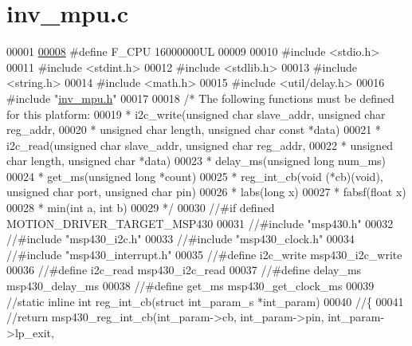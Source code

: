 \hypertarget{inv__mpu_8c_source}{}\section{inv\+\_\+mpu.\+c}
\label{inv__mpu_8c_source}

\begin{DoxyCode}
00001 
\hypertarget{inv__mpu_8c_source.tex_l00008}{}\hyperlink{inv__mpu_8c_a43bafb28b29491ec7f871319b5a3b2f8}{00008} \textcolor{preprocessor}{#define F\_CPU 16000000UL}
00009 
00010 \textcolor{preprocessor}{#include <stdio.h>}
00011 \textcolor{preprocessor}{#include <stdint.h>}
00012 \textcolor{preprocessor}{#include <stdlib.h>}
00013 \textcolor{preprocessor}{#include <string.h>}
00014 \textcolor{preprocessor}{#include <math.h>}
00015 \textcolor{preprocessor}{#include <util/delay.h>}
00016 \textcolor{preprocessor}{#include "\hyperlink{inv__mpu_8h}{inv\_mpu.h}"}
00017 
00018 \textcolor{comment}{/* The following functions must be defined for this platform:}
00019 \textcolor{comment}{ * i2c\_write(unsigned char slave\_addr, unsigned char reg\_addr,}
00020 \textcolor{comment}{ *      unsigned char length, unsigned char const *data)}
00021 \textcolor{comment}{ * i2c\_read(unsigned char slave\_addr, unsigned char reg\_addr,}
00022 \textcolor{comment}{ *      unsigned char length, unsigned char *data)}
00023 \textcolor{comment}{ * delay\_ms(unsigned long num\_ms)}
00024 \textcolor{comment}{ * get\_ms(unsigned long *count)}
00025 \textcolor{comment}{ * reg\_int\_cb(void (*cb)(void), unsigned char port, unsigned char pin)}
00026 \textcolor{comment}{ * labs(long x)}
00027 \textcolor{comment}{ * fabsf(float x)}
00028 \textcolor{comment}{ * min(int a, int b)}
00029 \textcolor{comment}{ */}
00030 \textcolor{comment}{//#if defined MOTION\_DRIVER\_TARGET\_MSP430}
00031 \textcolor{comment}{//#include "msp430.h"}
00032 \textcolor{comment}{//#include "msp430\_i2c.h"}
00033 \textcolor{comment}{//#include "msp430\_clock.h"}
00034 \textcolor{comment}{//#include "msp430\_interrupt.h"}
00035 \textcolor{comment}{//#define i2c\_write   msp430\_i2c\_write}
00036 \textcolor{comment}{//#define i2c\_read    msp430\_i2c\_read}
00037 \textcolor{comment}{//#define delay\_ms    msp430\_delay\_ms}
00038 \textcolor{comment}{//#define get\_ms      msp430\_get\_clock\_ms}
00039 \textcolor{comment}{//static inline int reg\_int\_cb(struct int\_param\_s *int\_param)}
00040 \textcolor{comment}{//\{}
00041     \textcolor{comment}{//return msp430\_reg\_int\_cb(int\_param->cb, int\_param->pin, int\_param->lp\_exit,}

\end{DoxyCode}
